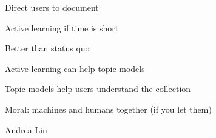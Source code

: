 \documentclass[compress]{beamer}
\newcommand{\fsi}[2]{
\begin{frame}[plain]
\vspace*{-1pt}
\makebox[\linewidth]{\texttt{[image: \#1]}}
\begin{center}
#2
\end{center}
\end{frame}
}
\begin{document}
\fsi{interactive_topic_models/alto_interface}{}
\fsi{interactive_topic_models/alto_interface_highlight}{Direct users
  to document}



\fsi{interactive_topic_models/alto/user_talk_1}{ Active learning if time is short}
\fsi{interactive_topic_models/alto/user_talk_2}{ Better than status quo}
\fsi{interactive_topic_models/alto/user_talk_3}{ Active learning can
  help topic models }
\fsi{interactive_topic_models/alto/user_talk_4}{ Topic models help
  users understand the collection }
\fsi{interactive_topic_models/alto/user_talk_4}{ Moral: machines and
  humans together (if you let them) }


\fsi{qb/viz_first_draft}{Andrea Lin}



\fsi{simtrans/liang_huang}{}
\fsi{simtrans/delay}{}
\end{document}
